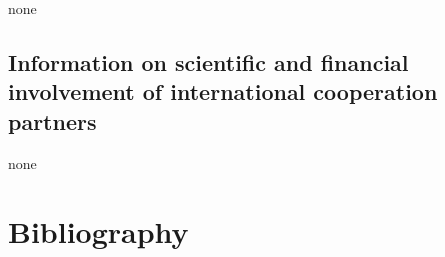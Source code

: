 \documentclass[10pt,fleqn,twoside]{article}
\newcommand{\Tcol}{\color{blue}}
\begin{document}
none
\vspace{-2mm}

\subsection{\Tcol Information on scientific and financial involvement of international cooperation partners}
\vspace{-2mm}

none
\vspace{-2mm}

\section{\Tcol Bibliography}
\vspace{-2mm}



\end{document}
